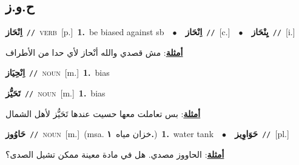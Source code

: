 \documentclass[10pt,a4paper,twoside]{article} %
\begin{document}
\begin{multicols}{2}
\vspace{-3mm}
\subsection*{\color{blue}\foreignlanguage{arabic}{ح.و.ز}\color{blue}{}} 

{\setlength\topsep{0pt}\textbf{\foreignlanguage{arabic}{اِنْحَاز}}\ {\color{gray}\texttt{//}\color{black}}\ \textsc{verb}\ [p.]\ \textbf{1.}~be biased against sb\ \ $\bullet$\ \ \setlength\topsep{0pt}\textbf{\foreignlanguage{arabic}{اِنْحَاز}}\ {\color{gray}\texttt{//}\color{black}}\ [c.]\ \ $\bullet$\ \ \setlength\topsep{0pt}\textbf{\foreignlanguage{arabic}{يِنْحَاز}}\ {\color{gray}\texttt{//}\color{black}}\ [i.]\  \begin{flushright}\color{gray}\foreignlanguage{arabic}{\textbf{\underline{\foreignlanguage{arabic}{أمثلة}}}: مش قصدي والله أنْحاز لأي حدا من الأطراف}\end{flushright}\color{black}} \vspace{2mm}

{\setlength\topsep{0pt}\textbf{\foreignlanguage{arabic}{اِنْحِيَاز}}\ {\color{gray}\texttt{//}\color{black}}\ \textsc{noun}\ [m.]\ \textbf{1.}~bias\ } \vspace{2mm}

{\setlength\topsep{0pt}\textbf{\foreignlanguage{arabic}{تَحَيُّز}}\ {\color{gray}\texttt{//}\color{black}}\ \textsc{noun}\ [m.]\ \textbf{1.}~bias\  \begin{flushright}\color{gray}\foreignlanguage{arabic}{\textbf{\underline{\foreignlanguage{arabic}{أمثلة}}}: بس تعاملت معها حسيت عندها تَحَيُّز لأهل الشمال}\end{flushright}\color{black}} \vspace{2mm}

{\setlength\topsep{0pt}\textbf{\foreignlanguage{arabic}{حَاوُوز}}\ {\color{gray}\texttt{//}\color{black}}\ \textsc{noun}\ [m.]\ \color{gray}(msa. \foreignlanguage{arabic}{خزان مياه}~\foreignlanguage{arabic}{\textbf{١.}})\color{black}\ \textbf{1.}~water tank\ \ $\bullet$\ \ \setlength\topsep{0pt}\textbf{\foreignlanguage{arabic}{حَوَاوِيز}}\ {\color{gray}\texttt{//}\color{black}}\ [pl.]\  \begin{flushright}\color{gray}\foreignlanguage{arabic}{\textbf{\underline{\foreignlanguage{arabic}{أمثلة}}}: الحاووز  مصدي. هل في مادة معينة ممكن تشيل الصدى؟}\end{flushright}\color{black}} \vspace{2mm}


\end{multicols}
\end{document}
